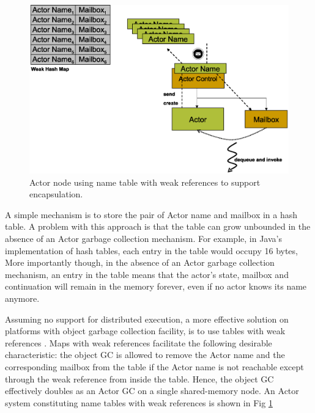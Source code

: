 \begin{figure}%
\centerline
{
\includegraphics[scale=0.4]{images/escape1.eps}
}
\caption{Actor node using name table with weak references to support encapsulation.}
\label{local_node}
\end{figure}


A simple mechanism is to store the pair of Actor name and mailbox in a hash table. A problem with this approach is that the table can grow unbounded in the absence of an Actor garbage collection mechanism. For example, in Java's implementation of hash tables, each entry in the table would occupy 16 bytes, More importantly though, in the absence of an Actor garbage collection mechanism, an entry in the table means that the actor's state, mailbox and continuation will remain in the memory forever, even if no actor knows its name anymore.


Assuming no support for distributed execution, a more effective solution on platforms with object garbage collection facility, is to use tables with weak references \cite{weakrefs}. Maps with weak references facilitate the following desirable characteristic: the object GC is allowed to remove the Actor name and the corresponding mailbox from the table if the Actor name is not reachable except through the weak reference from inside the table. Hence, the object GC effectively doubles as an Actor GC on a single shared-memory node. An Actor system constituting name tables with weak references is shown in Fig \ref{local_node}


